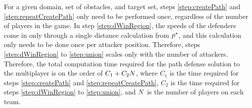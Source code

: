 For a given domain, set of obstacles, and target set, steps \ref{step:createPath} and \ref{step:repeatCreatePath} only need to be performed once, regardless of the number of players in the game. In step \ref{step:dWinRegion}, the speeds of the defenders come in only through a single distance calculation from $p^*$, and this calculation only needs to be done once per attacker position. Therefore, steps \ref{step:dWinRegion} to \ref{step:union} scales only with the number of attackers. Therefore, the total computation time required for the path defense solution to the multiplayer is on the order of $C_1 + C_2 N$, where $C_1$ is the time required for steps \ref{step:createPath} and \ref{step:repeatCreatePath}, $C_2$ is the time required for steps \ref{step:dWinRegion} to \ref{step:union}, and $N$ is the number of players on each team. 

